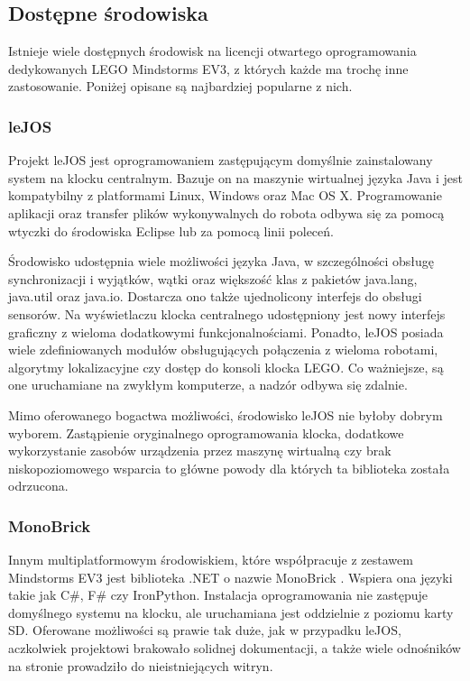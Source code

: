 \subsection{Dostępne środowiska}

Istnieje wiele dostępnych środowisk na licencji otwartego oprogramowania dedykowanych LEGO Mindstorms EV3, z których każde ma trochę inne zastosowanie. Poniżej opisane są najbardziej popularne z nich.

\subsubsection{leJOS}

Projekt leJOS \cite{lejos} jest oprogramowaniem zastępującym domyślnie zainstalowany system na klocku centralnym. Bazuje on na maszynie wirtualnej języka Java i jest kompatybilny z platformami Linux, Windows oraz Mac OS X. Programowanie aplikacji oraz transfer plików wykonywalnych do robota odbywa się za pomocą wtyczki do środowiska Eclipse lub za pomocą linii poleceń.

Środowisko udostępnia wiele możliwości języka Java, w szczególności obsługę synchronizacji i wyjątków, wątki oraz większość klas z pakietów java.lang, java.util oraz java.io. Dostarcza ono także ujednolicony interfejs do obsługi sensorów. Na wyświetlaczu klocka centralnego udostępniony jest nowy interfejs graficzny z wieloma dodatkowymi funkcjonalnościami. Ponadto, leJOS posiada wiele zdefiniowanych modułów obsługujących połączenia z wieloma robotami, algorytmy lokalizacyjne czy dostęp do konsoli klocka LEGO. Co ważniejsze, są one uruchamiane na zwykłym komputerze, a nadzór odbywa się zdalnie.

Mimo oferowanego bogactwa możliwości, środowisko leJOS nie byłoby dobrym wyborem. Zastąpienie oryginalnego oprogramowania klocka, dodatkowe wykorzystanie zasobów urządzenia przez maszynę wirtualną czy brak niskopoziomowego wsparcia to główne powody dla których ta biblioteka została odrzucona.

\subsubsection{MonoBrick}

Innym multiplatformowym środowiskiem, które współpracuje z zestawem Mindstorms EV3 jest biblioteka .NET o nazwie MonoBrick \cite{monobrick}. Wspiera ona języki takie jak C\#, F\# czy IronPython. Instalacja oprogramowania nie zastępuje domyślnego systemu na klocku, ale uruchamiana jest oddzielnie z poziomu karty SD. Oferowane możliwości są prawie tak duże, jak w przypadku leJOS, aczkolwiek projektowi brakowało solidnej dokumentacji, a także wiele odnośników na stronie prowadziło do nieistniejących witryn.

